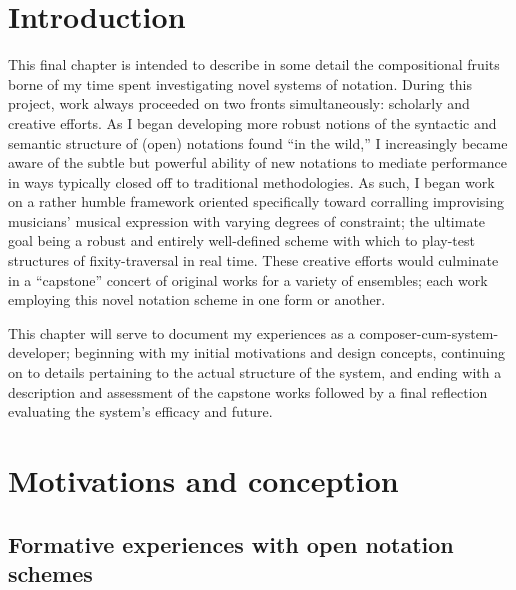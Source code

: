 \section{Introduction}

    This final chapter is intended to describe in some detail the compositional fruits borne of my time spent investigating novel systems of notation. During this project, work always proceeded on two fronts simultaneously: scholarly and creative efforts. As I began developing more robust notions of the syntactic and semantic structure of (open) notations found ``in the wild,'' I increasingly became aware of the subtle but powerful ability of new notations to mediate performance in ways typically closed off to traditional methodologies. As such, I began work on a rather humble framework oriented specifically toward corralling improvising musicians' musical expression with varying degrees of constraint; the ultimate goal being a robust and entirely well-defined scheme with which to play-test structures of fixity-traversal in real time. These creative efforts would culminate in a ``capstone'' concert of original works for a variety of ensembles; each work employing this novel notation scheme in one form or another.
    
    This chapter will serve to document my experiences as a composer-cum-system-developer; beginning with my initial motivations and design concepts, continuing on to details pertaining to the actual structure of the system, and ending with a description and assessment of the capstone works followed by a final reflection evaluating the system's efficacy and future.

\section{Motivations and conception}
    \subsection{Formative experiences with open notation schemes}

